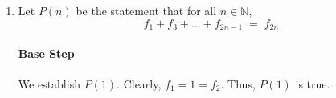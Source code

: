 \documentclass[10pt]{article}
\begin{document}
\begin{enumerate}
\begin{enumerate}
                        \paragraph{Base Step}
                        We establish $P(1)$. Clearly, $f_1 = 1 = (\varphi - \psi)/\sqrt{5}$. Thus, $P(1)$ is true.
                        \paragraph{Inductive Step}
                        We assume that the statements $P(2), P(3), \dots, P(k)$ are all true. We will show that $P(k + 1)$ is true.
                        \begin{align*}
                                f_{k + 1} \;&=\; f_{k} + f_{k - 1} \\
                                        \;&=\; \frac{1}{\sqrt{5}}(\varphi^k - \psi^k) + \frac{1}{\sqrt{5}}(\varphi^{k - 1} + \psi^{k - 1}) \\
                                        \;&=\; \frac{1}{\sqrt{5}}(\varphi^{k - 1}(\varphi + 1) - \psi^{k - 1}(\psi + 1)) \\
                                        \;&=\; \frac{1}{\sqrt{5}}(\varphi^{k - 1}(\varphi^2) - \psi^{k - 1}(\psi^2)) \\
                                        \;&=\; \frac{1}{\sqrt{5}}(\varphi^{k + 1} - \psi^{k + 1})
                        \end{align*}
                        Hence, by the principle of strong induction, $P(n)$ is true for all $n \in \mathbb{N}$.\qed\\
                        
                        \item Let $P(n)$ be the statement that for all $n \in \mathbb{N}$,
                        \[
                        f_1 + f_3 + \dots + f_{2n - 1} \;=\; f_{2n}
                        \]
                        \paragraph{Base Step}
                        We establish $P(1)$. Clearly, $f_1 = 1 = f_2$. Thus, $P(1)$ is true.

\end{enumerate}
\end{enumerate}
\end{document}
